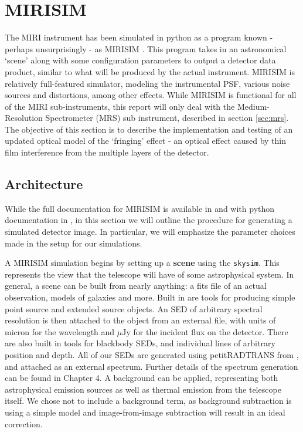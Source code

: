 \section{MIRISIM}

The MIRI instrument has been simulated in python as a program known - perhaps unsurprisingly - as MIRISIM \parencite{ref:mirisimdocs}. 
This program takes in an astronomical `scene' along with some configuration parameters to output a detector data product, similar to what will be produced by the actual instrument.
MIRISIM is relatively full-featured simulator, modeling the instrumental PSF, various noise sources and distortions, among other effects.
While MIRISIM is functional for all of the MIRI sub-instruments, this report will only deal with the Medium-Resolution Spectrometer (MRS) sub instrument, described in section \ref{sec:mrs}.
The objective of this section is to describe the implementation and testing of an updated optical model of the `fringing' effect - an optical effect caused by thin film interference from the multiple layers of the detector.
\subsection{Architecture}
While the full documentation for MIRISIM is available in \parencite{ref:mirisimdocs} and with python documentation in \parencite{Cossou2018}, in this section we will outline the procedure for generating a simulated detector image.
In particular, we will emphasize the parameter choices made in the setup for our simulations.

A MIRISIM simulation begins by setting up a \textbf{scene} using the \verb|skysim|. 
This represents the view that the telescope will have of some astrophysical system.
In general, a scene can be built from nearly anything: a fits file of an actual observation, models of galaxies and more. 
Built in are tools for producing simple point source and extended source objects.
An SED of arbitrary spectral resolution is then attached to the object from an external file, with units of micron for the wavelength and $\mu$Jy for the incident flux on the detector.
There are also built in tools for blackbody SEDs, and individual lines of arbitrary position and depth.
All of our SEDs are generated using petitRADTRANS from \parencite{Molliere2019}, and attached as an external spectrum.
Further details of the spectrum generation can be found in Chapter 4.
A background can be applied, representing both astrophysical emission sources as well as thermal emission from the telescope itself.
We chose not to include a background term, as background subtraction is using a simple model and image-from-image subtraction will result in an ideal correction.

